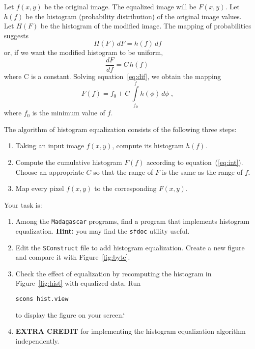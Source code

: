 Let $f(x,y)$ be the original image. The equalized image will be
$F(x,y)$. Let $h(f)$ be the histogram (probability distribution) of
the original image values. Let $H(F)$ be the histogram of the modified
image. The mapping of probabilities suggests
\begin{equation}
\label{eq:prob}
H(F)\,dF = h(f)\,df
\end{equation}
or, if we want the modified histogram
to be uniform, 
\begin{equation}
\label{eq:dif}
\frac{d F}{d f} = C\,h(f)\,
\end{equation}
where C is a constant. 
Solving equation~\ref{eq:dif}, we obtain the mapping
\begin{equation}
\label{eq:int}
F(f) = f_0 + C\,\int\limits_{f_0}^f h(\phi)\,d\phi\;,
\end{equation}
where $f_0$ is the minimum value of $f$.

The algorithm of histogram equalization consists of the following
three steps:
\begin{enumerate}
\item Taking an input image $f(x,y)$, compute its histogram $h(f)$.
\item Compute the cumulative histogram $F(f)$ according to 
equation~(\ref{eq:int}). Choose an appropriate $C$ so that the range
of $F$ is the same as the range of $f$.
\item Map every pixel $f(x,y)$ to the corresponding $F(x,y)$.
\end{enumerate}

Your task is:
\begin{enumerate}
\item Among the \texttt{Madagascar} programs, find a program that 
implements histogram equalization. \textbf{Hint:} you may find
the \texttt{sfdoc} utility useful.
\item Edit the \texttt{SConstruct} file to add histogram equalization. 
Create a new figure and compare it with Figure~\ref{fig:byte}.
\item Check the effect of equalization by recomputing the histogram 
in Figure~\ref{fig:hist} with equalized data. Run
\begin{verbatim}
scons hist.view
\end{verbatim}
to display the figure on your screen.`
\item \textbf{EXTRA CREDIT} for implementing the histogram
equalization algorithm independently.
\end{enumerate}	

